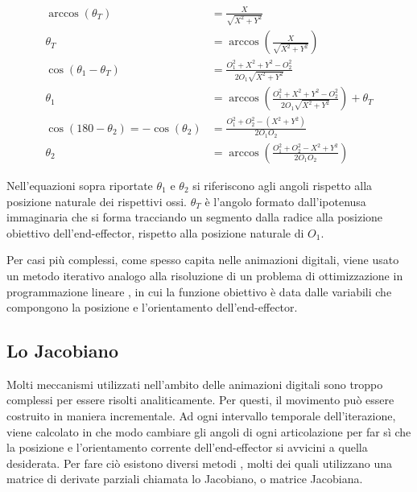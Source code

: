 \begin{align}
    \arccos{ (\theta _T) } &=  \frac{X}{\sqrt{X^2+Y^2}}\\
    \theta_T &= \arccos{\left(  \frac{X}{\sqrt{X^2+Y^2}} \right)}\\
    \cos{( \theta_1-\theta_T )} &=  \frac{O_1^2+X^2+Y^2-O_2^2}{2O_1\sqrt{X^2+Y^2}}\\
    \theta_1 &= \arccos{\left(  \frac{O_1^2+X^2+Y^2-O_2^2}{2O_1\sqrt{X^2+Y^2}}\right)}+\theta_T\\
    \cos{(180-\theta_2)} = -\cos{(\theta_2)} &= \frac{O_1^2+O_2^2-(X^2+Y^2)}{2O_1O_2}\\
    \theta_2 &= \arccos{\left(\frac{O_1^2+O_2^2-X^2+Y^2}{2O_1O_2}\right)}
\end{align}

Nell'equazioni sopra riportate $\theta_1$ e $\theta_2$ si riferiscono agli angoli rispetto alla posizione naturale dei rispettivi ossi.
$\theta_T$ è l'angolo formato dall'ipotenusa immaginaria che si forma tracciando un segmento dalla radice alla posizione obiettivo dell'end-effector, rispetto alla posizione naturale di $O_1$.

Per casi più complessi, come spesso capita nelle animazioni digitali, viene usato un metodo iterativo  analogo alla risoluzione di un problema di ottimizzazione in programmazione lineare \cite{lp2017}, in cui la funzione obiettivo è data dalle variabili che compongono la posizione e l'orientamento dell'end-effector.

\subsection{Lo Jacobiano}

Molti meccanismi utilizzati nell'ambito delle animazioni digitali sono troppo complessi per essere risolti analiticamente.
Per questi, il movimento può essere costruito in maniera incrementale.
Ad ogni intervallo temporale dell'iterazione, viene calcolato in che modo cambiare gli angoli di ogni articolazione per far sì che la posizione e l'orientamento corrente dell'end-effector si avvicini a quella desiderata.
Per fare ciò esistono diversi metodi \cite{simplex2011, simplex2006} \cite{mingozR2019} \cite{mingozD2019} \cite{blendWiki}, molti dei quali utilizzano una matrice di derivate parziali chiamata lo Jacobiano, o matrice Jacobiana.

